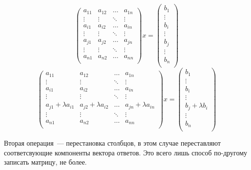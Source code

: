 \documentclass[11pt,a4paper,oneside]{article}
\begin{document}
$$ \left(\begin{matrix}
	a_{11} & a_{12} & \dots & a_{1n} \\
	\vdots & \vdots & \ddots & \vdots \\
	a_{i1} & a_{i2} & \dots & a_{in} \\
	\vdots & \vdots & \ddots & \vdots \\
	a_{j1} & a_{j2} & \dots & a_{jn} \\
	\vdots & \vdots & \ddots & \vdots \\
	a_{n1} & a_{n2} & \dots & a_{nn} \\
\end{matrix}\right) x =
\left(\begin{matrix}
	b_1 \\
	\vdots \\
	b_i \\
	\vdots \\
	b_j \\
	\vdots \\
	b_n \\
\end{matrix}\right) $$
$$ \left(\begin{matrix}
	a_{11} & a_{12} & \dots & a_{1n} \\
	\vdots & \vdots & \ddots & \vdots \\
	a_{i1} & a_{i2} & \dots & a_{in} \\
	\vdots & \vdots & \ddots & \vdots \\
	a_{j1} + \lambda a_{i1} & a_{j2} + \lambda a_{i2} & \dots & a_{jn} + \lambda a_{in} \\
	\vdots & \vdots & \ddots & \vdots \\
	a_{n1} & a_{n2} & \dots & a_{nn} \\
\end{matrix}\right) x = 
\left(\begin{matrix}
	b_1 \\
	\vdots \\
	b_i \\
	\vdots \\
	b_j + \lambda b_i \\
	\vdots \\
	b_n \\
\end{matrix}\right) $$

Вторая операция~--- перестановка столбцов, в этом случае переставляют соответсвующие компоненты вектора ответов. Это всего лишь способ по-другому записать матрицу, не более.
\end{document}

